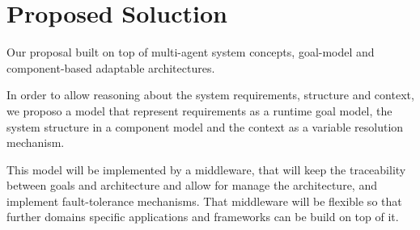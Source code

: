 \section{Proposed Soluction}

Our proposal built on top of multi-agent system concepts, goal-model and component-based adaptable architectures.

In order to allow reasoning about the system requirements, structure and context, we proposo a model that represent requirements as a runtime goal model, the system structure in a component model and the context as a variable resolution mechanism.

This model will be implemented by a middleware, that will keep the traceability between goals and architecture and allow for manage the architecture, and implement fault-tolerance mechanisms. That middleware will be flexible so that further domains specific applications and frameworks can be build on top of it.


\begin{comment}

Finally we explore how to use the middleware support for development of distributed, open-adaptable, opportunistic and evolvable application.

As a support for open-systems, we propose a multi-agent approach in witch agents can collaborate by making peer agents 'strategies' discoverable.

\begin{figure}
  \centering
  \texttt{[image: goalp-agent-repo-rcm-depl]}
  \caption{The proposed agent composition}
  \label{fig:agent_composition}
\end{figure}

We followed an approach with run-time goal model with an mechanism for compositional adaptation and multi-agent collaboration. In our propose adaptiveness is achieved by means of strategies matching an selection at runtime. For more flexibility we propose a symmetric design.

By composable simetry we mean that we should be able to compose strategies in new strategies, and made agents out of strategies and teams out of agents. All with the same interface, transparent for a peer client.

\end{comment}

